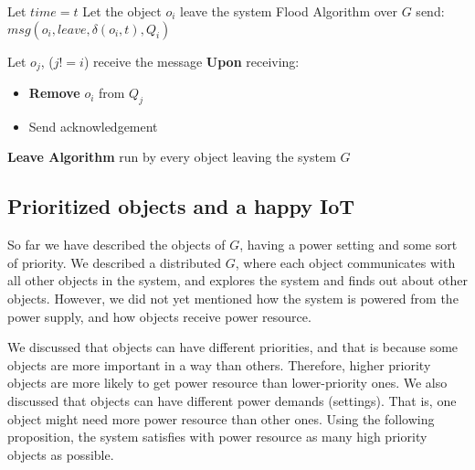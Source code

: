 \documentclass[../main/Self-Stabilization.tex]{subfiles}
\begin{document}
\LinesNumbered
\IncMargin{1em}
\begin{algorithm}
Let $time = t$ \newline
Let the object $o_{i}$ leave the system \newline
Flood Algorithm over $G$ \newline
send: $msg(o_{i}, leave,\delta(o_{i}, t), Q_{i})$
\BlankLine

 {
    Let $o_{j}$, ($j!=i$) receive the message
    \BlankLine
    \textbf{Upon} receiving:\newline
     {
        \begin{itemize}
          \item \textbf{Remove} $o_{i}$ from $Q_{j}$
          \item Send acknowledgement
        \end{itemize}
    }
}
\caption{\textbf{Leave Algorithm} run by every object leaving the system $G$} \label{algo2}
\end{algorithm}
\DecMargin{1em}

\subsection{Prioritized objects and a happy IoT}

So far we have described the objects of $G$, having a power setting and some sort of priority. We described a distributed $G$, where each object communicates with all other objects in the system, and explores the system and finds out about other objects. However, we did not yet mentioned how the system is powered from the power supply, and how objects receive power resource.

We discussed that objects can have different priorities, and that is because some objects are more important in a way than others. Therefore, higher priority objects are more likely to get power resource than lower-priority ones. We also discussed that objects can have different power demands (settings). That is, one object might need more power resource than other ones. Using the following proposition, the system satisfies with power resource as many high priority objects as possible.
\end{document}
